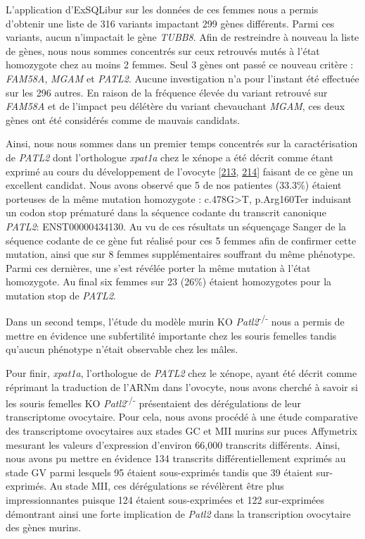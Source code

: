 \documentclass[12pt,a4paper,twoside]{ugathesis}
\theoremstyle{definition}
\theoremstyle{definition}
\theoremstyle{definition}
\theoremstyle{remark}
\begin{document}
L'application d'ExSQLibur sur les données de ces femmes nous a permis
d'obtenir une liste de 316 variants impactant 299 gènes différents.
Parmi ces variants, aucun n'impactait le gène \emph{TUBB8}. Afin de
restreindre à nouveau la liste de gènes, nous nous sommes concentrés sur
ceux retrouvés mutés à l'état homozygote chez au moins 2 femmes. Seul 3
gènes ont passé ce nouveau critère : \emph{FAM58A}, \emph{MGAM} et
\emph{PATL2}. Aucune investigation n'a pour l'instant été effectuée sur
les 296 autres. En raison de la fréquence élevée du variant retrouvé sur
\emph{FAM58A} et de l'impact peu délétère du variant chevauchant
\emph{MGAM}, ces deux gènes ont été considérés comme de mauvais
candidats.

Ainsi, nous nous sommes dans un premier temps concentrés sur la
caractérisation de \emph{PATL2} dont l'orthologue \emph{xpat1a} chez le
xénope a été décrit comme étant exprimé au cours du développement de
l'ovocyte {[}\protect\hyperlink{ref-Marnef2010}{213},
\protect\hyperlink{ref-Nakamura2010}{214}{]} faisant de ce gène un
excellent candidat. Nous avons observé que 5 de nos patientes (33.3\%)
étaient porteuses de la même mutation homozygote :
c.478G\textgreater{}T, p.Arg160Ter induisant un codon stop prématuré
dans la séquence codante du transcrit canonique \emph{PATL2}:
ENST00000434130. Au vu de ces résultats un séquençage Sanger de la
séquence codante de ce gène fut réalisé pour ces 5 femmes afin de
confirmer cette mutation, ainsi que sur 8 femmes supplémentaires
souffrant du même phénotype. Parmi ces dernières, une s'est révélée
porter la même mutation à l'état homozygote. Au final six femmes sur 23
(26\%) étaient homozygotes pour la mutation stop de \emph{PATL2}.

Dans un second temps, l'étude du modèle murin KO
\emph{Patl2}\textsuperscript{-/-} nous a permis de mettre en évidence
une subfertilité importante chez les souris femelles tandis qu'aucun
phénotype n'était observable chez les mâles.

Pour finir, \emph{xpat1a}, l'orthologue de \emph{PATL2} chez le xénope,
ayant été décrit comme réprimant la traduction de l'ARNm dans l'ovocyte,
nous avons cherché à savoir si les souris femelles KO
\emph{Patl2}\textsuperscript{-/-} présentaient des dérégulations de leur
transcriptome ovocytaire. Pour cela, nous avons procédé à une étude
comparative des transcriptome ovocytaires aux stades GC et MII murins
sur puces Affymetrix mesurant les valeurs d'expression d'environ 66,000
transcrits différents. Ainsi, nous avons pu mettre en évidence 134
transcrits différentiellement exprimés au stade GV parmi lesquels 95
étaient sous-exprimés tandis que 39 étaient sur-exprimés. Au stade MII,
ces dérégulations se révélèrent être plus impressionnantes puisque 124
étaient sous-exprimées et 122 sur-exprimées démontrant ainsi une forte
implication de \emph{Patl2} dans la transcription ovocytaire des gènes
murins.
\end{document}
